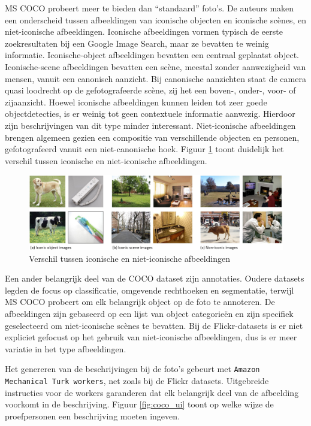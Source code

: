 MS COCO probeert meer te bieden dan ``standaard'' foto's. De auteurs maken een onderscheid tussen afbeeldingen van iconische objecten en iconische sc\`enes, en niet-iconische afbeeldingen. Iconische afbeeldingen vormen typisch de eerste zoekresultaten bij een Google Image Search, maar ze bevatten te weinig informatie. Iconische-object afbeeldingen bevatten een centraal geplaatst object. Iconische-scene afbeeldingen bevatten een sc\`ene, meestal zonder aanwezigheid van mensen, vanuit een canonisch aanzicht. Bij canonische aanzichten staat de camera quasi loodrecht op de gefotografeerde sc\`ene, zij het een boven-, onder-, voor- of zijaanzicht. Hoewel iconische afbeeldingen kunnen leiden tot zeer goede objectdetecties, is er weinig tot geen contextuele informatie aanwezig. Hierdoor zijn beschrijvingen van dit type minder interessant.  Niet-iconische afbeeldingen brengen algemeen gezien een compositie van verschillende objecten en personen, gefotografeerd vanuit een niet-canonische hoek. Figuur \ref{fig:cocotypes} toont duidelijk het verschil tussen iconische en niet-iconische afbeeldingen.

\begin{figure}[tb]
    \centering
    \includegraphics[width=\linewidth]{Images/iconic.jpg}
    \caption{Verschil tussen iconische en niet-iconische afbeeldingen\cite{Lin2014}}
    \label{fig:cocotypes}
\end{figure}

Een ander belangrijk deel van de COCO dataset zijn annotaties. Oudere datasets legden de focus op classificatie, omgevende rechthoeken en segmentatie, terwijl MS COCO probeert om elk belangrijk object op de foto te annoteren. De afbeeldingen zijn gebaseerd op een lijst van object categorie\"en en zijn specifiek geselecteerd om niet-iconische sc\`enes te bevatten. Bij de Flickr-datasets is er niet expliciet gefocust op het gebruik van niet-iconische afbeeldingen, dus is er meer variatie in het type afbeeldingen.

Het genereren van de beschrijvingen bij de foto's gebeurt met \texttt{Amazon Mechanical Turk workers}, net zoals bij de Flickr datasets. Uitgebreide instructies voor de workers garanderen dat elk belangrijk deel van de afbeelding voorkomt in de beschrijving\cite{Rampf2015}. Figuur \ref{fig:coco_ui} toont op welke wijze de proefpersonen een beschrijving moeten ingeven.



